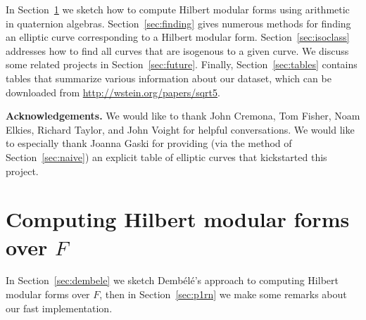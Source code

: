 \documentclass{amsart}
\newcommand{\dembele}{Demb\'el{\'e}\xspace}
\begin{document}
In Section~\ref{sec:hmf} we sketch how to compute Hilbert modular
forms using arithmetic in quaternion
algebras. Section~\ref{sec:finding} gives numerous methods for finding
an elliptic curve corresponding to a Hilbert modular form.
Section~\ref{sec:isoclass} addresses how to find all curves that are
isogenous to a given curve.  We discuss some related projects in
Section~\ref{sec:future}.  Finally, Section~\ref{sec:tables} contains
tables that summarize various information about our
dataset, which can be downloaded from
\url{http://wstein.org/papers/sqrt5}.

{\bf Acknowledgements.} We would like to thank John Cremona, Tom
Fisher, Noam Elkies, Richard Taylor, and John Voight for helpful
conversations.  We would like to especially thank Joanna Gaski for
providing (via the method of Section~\ref{sec:naive}) an explicit
table of elliptic curves that kickstarted this project.

\section{Computing Hilbert modular forms over $F$}\label{sec:hmf}

In Section~\ref{sec:dembele} we sketch \dembele's approach to computing Hilbert
modular forms over $F$, then in Section~\ref{sec:p1rn} we make
some remarks about our fast implementation. 
\end{document}
